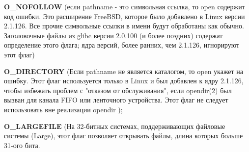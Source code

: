 \documentclass[12pt]{report}
\begin{document}
\textbf{O\_NOFOLLOW}
(если pathname - это символьная ссылка, то open содержит код ошибки. Это расширение FreeBSD, которое было добавлено в Linux версии 2.1.126. Все прочие символьные ссылки в имени будут обработаны как обычно. Заголовочные файлы из glibc версии 2.0.100 (и более поздних) содержат определение этого флага; ядра версий, более ранних, чем 2.1.126, игнорируют этот флаг)


\textbf{O\_DIRECTORY}
(Если pathname не является каталогом, то open укажет на ошибку. Этот флаг используется только в Linux и был добавлен к ядру 2.1.126, чтобы избежать проблем с "отказом от обслуживания", если opendir(2) был вызван для канала FIFO или ленточного устройства. Этот флаг не следует использовать вне реализации opendir );


\textbf{O\_LARGEFILE}
(На 32-битных системах, поддерживающих файловые системы (Large), этот флаг позволяет открывать файлы, длина которых больше 31-ого бита.
\end{document}
